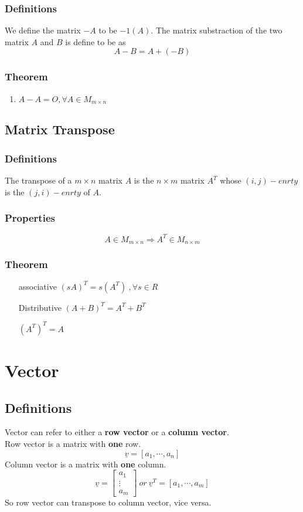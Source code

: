 \documentclass[12pt]{article}
\begin{document}
\subsubsection{Definitions}
We define the matrix $-A$ to be $-1(A)$. The matrix substraction of the two matrix $A$ and $B$ is define to be as
$$A-B = A+(-B)$$
\subsubsection{Theorem}
\begin{enumerate}
\item $A-A = O, \forall A \in M_{m \times n}$
\end{enumerate}

\subsection{Matrix Transpose}
\subsubsection{Definitions}
The transpose of a $m \times n$ matrix $A$ is the $n \times m$ matrix $A^T$ whose $(i,j)-enrty$ is the $(j,i)-enrty$ of $A.$ 
\subsubsection{Properties}
$$A \in M_{m \times n} \Rightarrow A^T \in M_{n \times m}$$
\subsubsection{Theorem}
\begin{enumerate}
\item[associative] $(sA)^T=s(A^T)\ ,\forall s \in R$
\item[Distributive] $(A+B)^T=A^T+B^T$
\item[] $(A^T)^T=A$
\end{enumerate}

\section{Vector}
\subsection{Definitions}
Vector can refer to either a \textbf{row vector} or a \textbf{column vector}.\\
Row vector is a matrix with \textbf{one} row.
$$\underline{v}=[a_1,\cdots,a_n]$$
Column vector is a matrix with \textbf{one} column.
\begin{equation}
	\underline{v}=
	\left[
	\begin{array}{c}
	a_1 \\
	\vdots \\
	a_m
	\end{array}
	\right]
	\ or\ \underline{v}^T=[a_1,\cdots,a_m]
\end{equation}
So row vector can transpose to column vector, vice versa.\\
\end{document}

